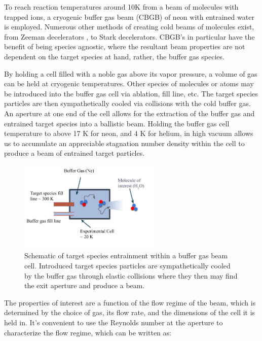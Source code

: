 To reach reaction temperatures around 10K from a beam of molecules with trapped ions, a cryogenic buffer gas beam (CBGB) of neon with entrained water is employed. Numerous other methods of creating cold beams of molecules exist, from Zeeman decelerators \cite{Narevicius2008}, to Stark decelerators. CBGB's in particular have the benefit of being species agnostic, where the resultant beam properties are not dependent on the target species at hand, rather, the buffer gas species. 

By holding a cell filled with a noble gas above its vapor pressure, a volume of gas can be held at cryogenic temperatures. Other species of molecules or atoms may be introduced into the buffer gas cell via ablation, fill line, etc. The target species particles are then sympathetically cooled via collisions with the cold buffer gas. An aperture at one end of the cell allows for the extraction of the buffer gas and entrained target species into a ballistic beam. Holding the buffer gas cell temperature to above 17 K for neon, and 4 K for helium, in high vacuum allows us to accumulate an appreciable stagnation number density within the cell to produce a beam of entrained target particles.

\begin{figure}[H]
	\centering
	\includegraphics[width=0.6\textwidth]{images/CBGB_diagram.png}
	\caption{Schematic of target species entrainment within a buffer gas beam cell. Introduced target species particles are sympathetically cooled by the buffer gas through elastic collisions where they then may find the exit aperture and produce a beam.}
\end{figure}

The properties of interest are a function of the flow regime of the beam, which is determined by the choice of gas, its flow rate, and the dimensions of the cell it is held in. It's convenient to use the Reynolds number at the aperture to characterize the flow regime, which can be written as:

